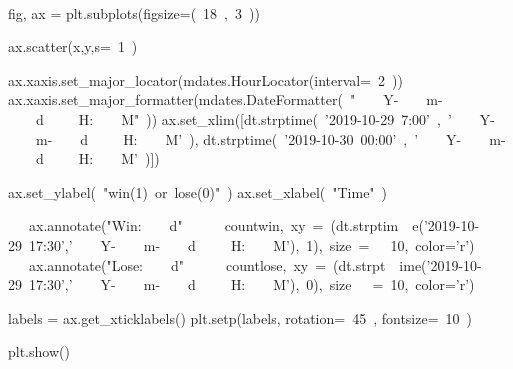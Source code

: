 \begin{paracol}{2}
\smallskip
\begin{cellExecute}[escapechar=~]
~~
\end{cellExecute}
\switchcolumn
\begin{codeCell}[escapechar=~]
fig, ax = plt.subplots(figsize=(~\textcolor{mtk7}{18}~,~\textcolor{mtk7}{3}~))

ax.scatter(x,y,s=~\textcolor{mtk7}{1}~)

ax.xaxis.set_major_locator(mdates.HourLocator(interval=~\textcolor{mtk7}{2}~))
ax.xaxis.set_major_formatter(mdates.DateFormatter(~\textcolor{mtk25}{"}~~~~\textcolor{mtk25}{Y-}~~~~\textcolor{mtk25}{m-}~~~~\textcolor{mtk25}{d }~~~~\textcolor{mtk25}{H:}~~~~\textcolor{mtk25}{M"}~))
ax.set_xlim([dt.strptime(~\textcolor{mtk25}{'2019-10-29 7:00'}~,~\textcolor{mtk25}{'}~~~~\textcolor{mtk25}{Y-}~~~~\textcolor{mtk25}{m-}~~~~\textcolor{mtk25}{d }~~~~\textcolor{mtk25}{H:}~~~~\textcolor{mtk25}{M'}~), dt.strptime(~\textcolor{mtk25}{'2019-10-30 00:00'}~,~\textcolor{mtk25}{'}~~~~\textcolor{mtk25}{Y-}~~~~\textcolor{mtk25}{m-}~~~~\textcolor{mtk25}{d }~~~~\textcolor{mtk25}{H:}~~~~\textcolor{mtk25}{M'}~)])

ax.set_ylabel(~\textcolor{mtk25}{"win(1) or lose(0)"}~)
ax.set_xlabel(~\textcolor{mtk25}{"Time"}~)

~~~\textcolor{mtk8}{ax.annotate("Win:}~~~~\textcolor{mtk8}{d" }~~~~\textcolor{mtk8}{ countwin, xy = (dt.strptim}~~\textcolor{mtk8}{e('2019-10-29 17:30','}~~~~\textcolor{mtk8}{Y-}~~~~\textcolor{mtk8}{m-}~~~~\textcolor{mtk8}{d }~~~~\textcolor{mtk8}{H:}~~~~\textcolor{mtk8}{M'), 1), size =}~~\textcolor{mtk8}{ 10, color='r')}~
~~~\textcolor{mtk8}{ax.annotate("Lose:}~~~~\textcolor{mtk8}{d" }~~~~\textcolor{mtk8}{ countlose, xy = (dt.strpt}~~\textcolor{mtk8}{ime('2019-10-29 17:30','}~~~~\textcolor{mtk8}{Y-}~~~~\textcolor{mtk8}{m-}~~~~\textcolor{mtk8}{d }~~~~\textcolor{mtk8}{H:}~~~~\textcolor{mtk8}{M'), 0), size}~~\textcolor{mtk8}{ = 10, color='r')}~

labels = ax.get_xticklabels()
plt.setp(labels, rotation=~\textcolor{mtk7}{45}~, fontsize=~\textcolor{mtk7}{10}~)

plt.show()
\end{codeCell}
\end{paracol}

